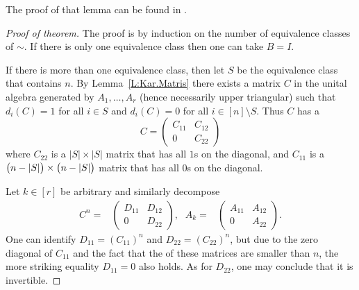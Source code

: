 \documentclass[12pt]{article}
\begin{document}
The proof of that lemma can be found in 
.


\begin{proof}[Proof of theorem]
  The proof is by induction on the number of equivalence classes of 
  $\sim$. If there is only one equivalence class then one can take 
  \(B=I\).
  
  If there is more than one equivalence class, then let $S$ be the 
  equivalence class that contains $n$. By Lemma~\ref{L:Kar.Matris} 
  there exists a matrix $C$ in the unital algebra generated by 
  $A_1,\dotsc,A_r$ (hence necessarily upper triangular) such that 
  \(d_i(C) = 1\) for all \(i \in S\) and \(d_i(C)=0\) for all \(i \in 
  [n] \setminus S\). Thus $C$ has a 
  \[
    C = \begin{pmatrix} C_{11}& C_{12} \\ 0& C_{22} \end{pmatrix}
  \]
  where $C_{22}$ is a $\lvert S\rvert \times \lvert S\rvert$ matrix 
  that has all $1$s on the diagonal, and $C_{11}$ is a 
  $\bigl( n -\nobreak \lvert S\rvert \bigr) \times
  \bigl( n -\nobreak \lvert S\rvert \bigr)$ matrix that has all $0$s 
  on the diagonal.
  
  Let \(k \in [r]\) be arbitrary and similarly decompose
  \begin{align*}
    C^n ={}& \begin{pmatrix} D_{11}& D_{12} \\ 0& D_{22} \end{pmatrix} 
    \text{,}&
    A_k ={}& \begin{pmatrix} A_{11}& A_{12} \\ 0& A_{22} \end{pmatrix} 
    \text{.}
  \end{align*}
  One can identify \(D_{11} = (C_{11})^n\) and \(D_{22} = (C_{22})^n\), 
  but due to the zero diagonal of $C_{11}$ and the fact that the 
  of these matrices are smaller than $n$, the more striking equality 
  \(D_{11}=0\) also holds. As for $D_{22}$, one may conclude that it 
  is invertible.
  

\end{proof}
\end{document}
